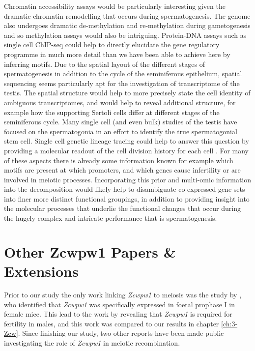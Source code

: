 Chromatin accessibility assays would be particularly interesting given the dramatic chromatin remodelling that occurs during spermatogenesis.
The genome also undergoes dramatic de-methylation and re-methylation during gametogenesis and so methylation assays would also be intriguing.
Protein-DNA assays such as single cell ChIP-seq could help to directly elucidate the gene regulatory programme in much more detail than we have been able to achieve here by inferring motifs.
Due to the spatial layout of the different stages of spermatogenesis in addition to the cycle of the seminiferous epithelium, spatial sequencing seems particularly apt for the investigation of transcriptome of the testis.
The spatial structure would help to more precisely state the cell identity of ambiguous transcriptomes, and would help to reveal additional structure, for example how the supporting Sertoli cells differ at different stages of the seminiferous cycle.
Many single cell (and even bulk) studies of the testis have focused on the spermatogonia in an effort to identify the true spermatogonial stem cell.
Single cell genetic lineage tracing could help to answer this question by providing a molecular readout of the cell division history for each cell \parencite[reviewed in][]{Baron2019Unravelling, McKenna2019Recording}.
For many of these aspects there is already some information known for example which motifs are present at which promoters, and which genes cause infertility or are involved in meiotic processes.
Incorporating this prior and multi-omic information into the decomposition would likely help to disambiguate co-expressed gene sets into finer more distinct functional groupings, in addition to providing insight into the molecular processes that underlie the functional changes that occur during the hugely complex and intricate performance that is spermatogenesis.

\section{Other Zcwpw1 Papers \& Extensions}

Prior to our study the only work linking \textit{Zcwpw1} to meiosis was the study by \cite{Soh2015Gene}, who identified that \textit{Zcwpw1} was specifically expressed in foetal prophase I in female mice.
This lead to the work by \cite{Li2019histone} revealing that \textit{Zcwpw1} is required for fertility in males, and this work was compared to our results in chapter \ref{ch:3-Zcw}.
Since finishing our study, two other reports have been made public investigating the role of \textit{Zcwpw1} in meiotic recombination.


